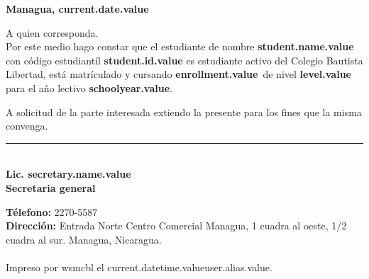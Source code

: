 \documentclass[12pt]{article}
\newcommand{\enrollmentName}{enrollment.value}
\newcommand{\levelName}{level.value}
\newcommand{\minedId}{student.id.value}
\newcommand{\studentName}{student.name.value}
\newcommand{\schoolYear}{schoolyear.value}
\newcommand{\currentDate}{current.date.value}
\newcommand{\secretaryName}{secretary.name.value}
\newcommand{\userAlias}{user.alias.value}
\newcommand{\currentDatetime}{current.datetime.value}
\begin{document}
    \hfill\textbf{Managua, \currentDate}

    A quien corresponda.\\

    Por este medio hago constar que el estudiante de nombre \textbf{\studentName} con código estudiantíl \textbf{\minedId}
    es estudiante activo del Colegio Bautista Libertad, está matrículado y cursando \textbf{\enrollmentName}~de nivel \textbf{\levelName}
    para el año lectivo \textbf{\schoolYear}.

    A solicitud de la parte interesada extiendo la presente para los fines que la misma convenga.

    \vspace{2cm}
    \begin{center}
        \rule{5cm}{0.4pt}\\[1mm]
        \textbf{Lic. \secretaryName}\\[3mm]
        \textbf{Secretaria general}
    \end{center}
    \vspace{2cm}

    \textbf{Télefono:} 2270-5587\\
    \textbf{Dirección:} Entrada Norte Centro Comercial Managua, 1 cuadra al oeste, 1/2 cuadra al sur. Managua, Nicaragua.\\\\
    {\footnotesize Impreso por wsmcbl el \currentDatetime\userAlias.}
\end{document}
